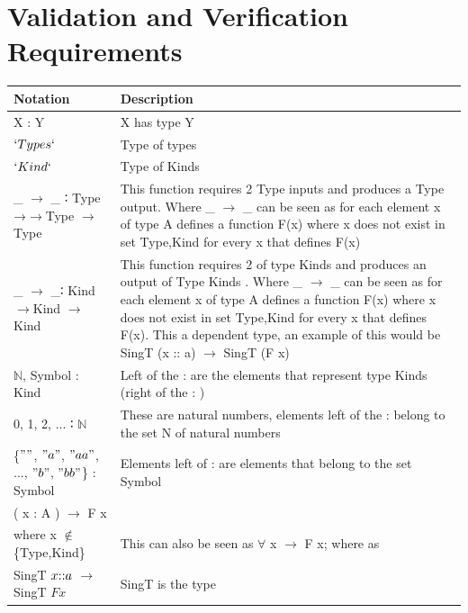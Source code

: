 \documentclass[12pt]{report}
\begin{document}
\section{Validation and Verification Requirements}\label{sec:Verification}


\begin{longtable}{|m{5cm}|m{9cm}| }
    \hline 
    \textbf{Notation}  & \textbf{Description} \\ \hline
       X : Y   &  X has type Y \\ 
        \hline  
       $`Types`$  &  Type of types \\ 
        \hline
       $`Kind`$   &  Type of Kinds \\ 
        \hline
         \_ $\rightarrow$ \_ ∶ Type →$\rightarrow$Type $\rightarrow$ Type  & 
         This function requires 2 Type inputs and produces a Type output. Where 
         \_ $\rightarrow$ \_ can be seen as for each element x of type A 
         defines a function F(x) where x does not exist in set {Type,Kind} for 
         every x that defines F(x)  \\ 
        \hline
       \_ $\rightarrow$ \_∶ Kind $\rightarrow$Kind $\rightarrow$ Kind  & This 
       function requires 2 of type Kinds and produces an output of Type Kinds . 
       Where 
       \_ $\rightarrow$ \_ can be seen as for each element x of type A 
       defines a function F(x) where x does not exist in set {Type,Kind} for 
       every x that defines F(x). This a dependent type, an example of this 
       would be 
       SingT (x :: a) $\rightarrow$ SingT (F x)
       \\ 
        \hline
          $\mathbb{N}$, Symbol : Kind   &  Left of the : are the elements that 
          represent type Kinds (right of the : )\\ 
        \hline
          0, 1, 2, $...$ ∶ $\mathbb{N}$   &  These are natural numbers, 
          elements left of the : belong to the set N of natural numbers\\ 
        \hline
         \{$""$, $"a"$, $"aa"$, $...$, $"b"$, $"bb"$\} : Symbol &  
         Elements left of : are elements that belong to the set Symbol \\ 
        \hline
        ( x : A  ) $\rightarrow$ F x   & \\ where x $\notin$ \{Type,Kind\}   &  
        This can also be seen as $\forall$ x $\rightarrow$ F x; where as  \\ 
        \hline
           SingT \(x $::$ a\) $\rightarrow$ SingT \(F x\)  &  SingT is the type 

\end{longtable}
\end{document}
